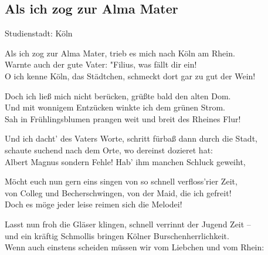 
\subsection*{Als ich zog zur Alma Mater}
%
%

\hfill%
Studienstadt: Köln\\

\thestrophe Als ich zog zur Alma Mater, trieb es mich nach Köln am Rhein. \\
Warnte auch der gute Vater: "Filius, was fällt dir ein! \\
O ich kenne Köln, das Städtchen, schmeckt dort gar zu gut der Wein! \\

\thestrophe Doch ich ließ mich nicht berücken, grüßte bald den alten Dom. \\
Und mit wonnigem Entzücken winkte ich dem grünen Strom. \\
Sah in Frühlingsblumen prangen weit und breit des Rheines Flur! \\

\thestrophe Und ich dacht' des Vaters Worte, schritt fürbaß dann durch die Stadt, \\
schaute suchend nach dem Orte, wo dereinst dozieret hat: \\
Albert Magnus sondern Fehle! Hab' ihm manchen Schluck geweiht, \\

\thestrophe Möcht euch nun gern eins singen von so schnell verfloss'rier Zeit, \\
von Colleg und Becherschwingen, von der Maid, die ich gefreit! \\
Doch es möge jeder leise reimen sich die Melodei! \\

\thestrophe Lasst nun froh die Gläser klingen, schnell verrinnt der Jugend Zeit – \\
und ein kräftig Schmollis bringen Kölner Burschenherrlichkeit.\\
Wenn auch einstens scheiden müssen wir vom Liebchen und vom Rhein: \\
